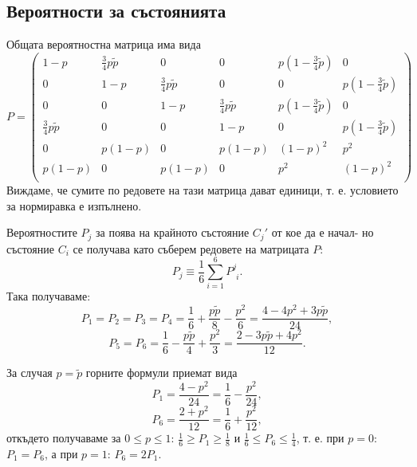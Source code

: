 \documentclass[english,bulgarian,a4paper,10pt]{article}
\begin{document}
\subsection{Вероятности за състоянията}
Общата вероятностна матрица има вида
\begin{equation}
 P = \begin{pmatrix}
      1-p  &\frac{3}{4}p\tilde{p} &0 &0 & p\left(1-\frac{3}{4}\tilde{p}\right) &0\\
      0 &1-p  &\frac{3}{4}p\tilde{p} &0 &0 & p\left(1-\frac{3}{4}\tilde{p}\right)\\
      0 &0 &1-p &\frac{3}{4}p\tilde{p} & p\left(1-\frac{3}{4}\tilde{p}\right) &0\\
      \frac{3}{4}p\tilde{p} &0 &0 &1-p &0 &p\left(1-\frac{3}{4}\tilde{p}\right)\\
      0 &p(1-p) &0 &p(1-p) &(1-p)^2 &p^2\\
      p(1-p) &0 &p(1-p) &0 &p^2 &(1-p)^2\\
     \end{pmatrix}
\end{equation}
Виждаме, че сумите по редовете на тази матрица дават единици, т. е. условието
за нормиравка е изпълнено.

Вероятностите $P_j$ за поява на крайното състояние $C_{j}'$ от кое да е начал- но
състояние $C_i$ се получава като съберем редовете на матрицата $P$:
\begin{equation}
 P_{j} \equiv \frac{1}{6}\sum_{i=1}^{6} P^{j}_{\phantom{j}i}.
\end{equation}
Така получаваме:
\begin{equation}
 P_1=P_2=P_3=P_4=\frac{1}{6} + \frac{p\tilde{p}}{8} - \frac{p^2}{6}=\frac{4-4p^2+3p\tilde{p}}{24},
\end{equation}
\begin{equation}
 P_5=P_6=\frac{1}{6}-\frac{p\tilde{p}}{4}+\frac{p^2}{3}=\frac{2-3p\tilde{p}+4p^2}{12}.
\end{equation}

За случая $p=\tilde{p}$ горните формули приемат вида
\begin{equation}
 P_1 = \frac{4-p^2}{24} = \frac{1}{6} - \frac{p^2}{24},
\end{equation}
\begin{equation}
 P_6 = \frac{2+p^2}{12} = \frac{1}{6} + \frac{p^2}{12},
\end{equation}
откъдето получаваме за $0\le p\le 1$: $\frac{1}{6}\ge P_1\ge \frac{1}{8}$
и $\frac{1}{6}\le P_6\le \frac{1}{4}$, т. е. при $p=0$: $P_1=P_6$,
а при $p=1$: $P_6 = 2P_1$.
\end{document}
